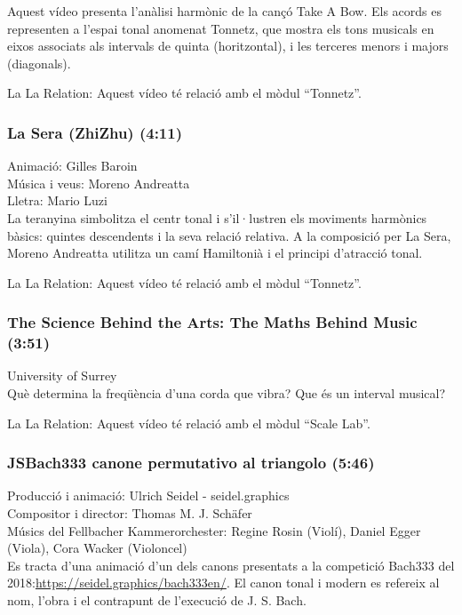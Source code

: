 Aquest vídeo presenta l'anàlisi harmònic de la cançó Take A Bow. Els acords es representen a l'espai tonal anomenat Tonnetz, que mostra els tons musicals en eixos associats als intervals de quinta (horitzontal), i les terceres menors i majors (diagonals).

La La Relation: Aquest vídeo té relació amb el mòdul ``Tonnetz''.

\subsubsection*{La Sera (ZhiZhu) (4:11)}
Animació: Gilles Baroin\\
Música i veus: Moreno Andreatta\\
Lletra: Mario Luzi\\

La teranyina simbolitza el centr tonal i s'il·lustren els moviments harmònics bàsics: quintes descendents i la seva relació relativa. A la composició per La Sera, Moreno Andreatta utilitza un camí Hamiltonià i el principi d'atracció tonal. 

La La Relation: Aquest vídeo té relació amb el mòdul ``Tonnetz''.

\subsubsection*{The Science Behind the Arts: The Maths Behind Music (3:51)}
University of Surrey\\

Què determina la freqüència d'una corda que vibra? Que és un interval musical?

La La Relation: Aquest vídeo té relació amb el mòdul ``Scale Lab''.

\subsubsection*{JSBach333 canone permutativo al triangolo (5:46)}
Producció i animació: Ulrich Seidel - seidel.graphics\\
Compositor i director: Thomas M. J. Schäfer\\ 
Músics del Fellbacher Kammerorchester: Regine Rosin (Violí), Daniel Egger (Viola), Cora Wacker (Violoncel) \\

Es tracta d'una animació d'un dels canons presentats a la competició Bach333 del 2018:\url{https://seidel.graphics/bach333en/}. El canon tonal i modern es refereix al nom, l'obra i el contrapunt de l'execució de J. S. Bach.

